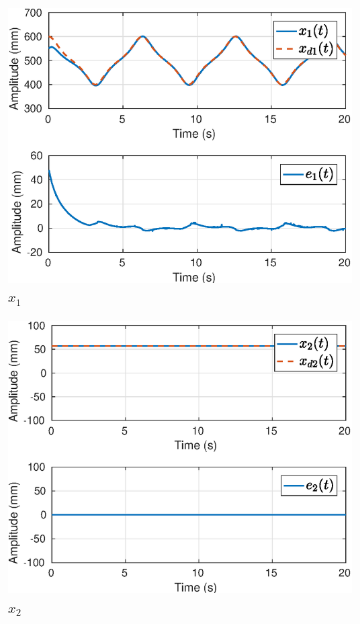 \begin{figure}[H]
\centering
\begin{subfigure}{.5\textwidth}
  \centering
  \includegraphics[width=\linewidth]{./img/traj_2_k1/x1.eps}
  \caption{$x_1$}
  \label{fig:sub1}
\end{subfigure}%
\begin{subfigure}{.5\textwidth}
  \centering
  \includegraphics[width=\linewidth]{./img/traj_2_k1/x2.eps}
  \caption{$x_2$}
  \label{fig:sub2}
\end{subfigure}
\begin{subfigure}{.5\textwidth}
  \centering

\end{subfigure}
\end{figure}
